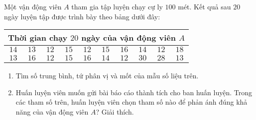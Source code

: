 \begin{bt}%
	Một vận động viên $A$ tham gia tập luyện chạy cự ly $100$ mét. Kết quả sau $20$ ngày luyện tập được trình bày theo bảng dưới đây: 
	\begin{center}
		\begin{tabular}{|c|c|c|c|c|c|c|c|c|c|}
			\hline
			\multicolumn{10}{|c|}{Thời gian chạy $20$ ngày của vận động viên $A$} \\
			\hline
			$14$ & $13$ & $12$ & $15$ & $12$ & $15$ & $16$ & $14$ & $12$ & $18$ \\
			\hline
			$13$ & $16$ & $12$ & $15$ & $16$ & $14$ & $12$ & $30$ & $28$ & $13$ \\
			\hline
		\end{tabular}
	\end{center}
	\begin{enumerate}
		\item Tìm số trung bình, tứ phân vị và mốt của mẫu số liệu trên.
		\item Huấn luyện viên muốn gửi bài báo cáo thành tích cho ban huấn luyện. Trong các tham số trên, huấn luyện viên chọn tham số nào để phản ánh đúng khả năng của vận động viên $A$? Giải thích.
	\end{enumerate} 
\end{bt}
